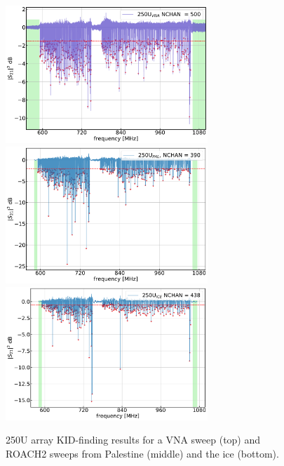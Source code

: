 \begin{figure}[!p]
\centering
\caption[~250U array KID-finding results.]{250U array KID-finding results for a VNA sweep (top) and ROACH2 sweeps from Palestine (middle) and the ice (bottom).}
\includegraphics[width=0.68\textwidth]{figures/blast_data/sweeps/250U_May2018VNA_FK}
\includegraphics[width=0.68\textwidth]{figures/blast_data/sweeps/250U_PAL_FK}
\includegraphics[width=0.68\textwidth]{figures/blast_data/sweeps/250U_ICE_FK}
\label{fig:250U FK}
\end{figure}



